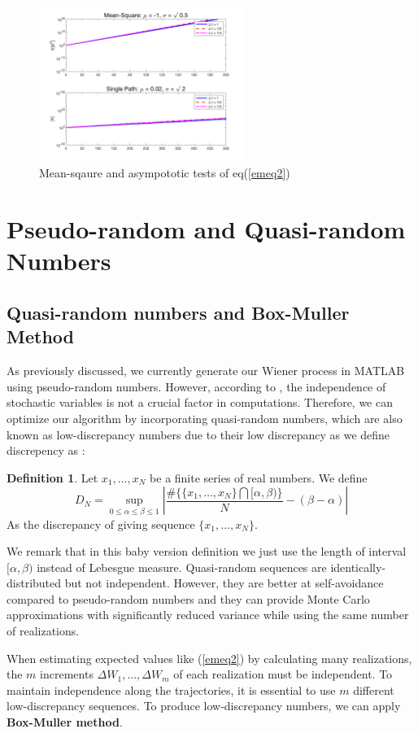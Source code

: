 \documentclass[12pt,a4paper]{article}
\theoremstyle{definition}
\newtheorem{defn}{Definition}
\begin{document}
\begin{figure}[htbp]
\centering
\includegraphics[width=0.6\textwidth]{fig/fig13.png}
\caption{\label{fig13} Mean-sqaure and asympototic tests of eq(\ref{emeq2})}
\end{figure}

\section{Pseudo-random and Quasi-random Numbers}
\subsection{Quasi-random numbers and Box-Muller Method}
As previously discussed, we currently generate our Wiener process in MATLAB using pseudo-random numbers. However, according to \cite{sauer}, the independence of stochastic variables is not a crucial factor in computations. Therefore, we can optimize our algorithm by incorporating quasi-random numbers, which are also known as low-discrepancy numbers due to their low discrepancy as we define discrepency as \cite{kuipers}:\begin{defn}
    Let $x_1,\dots, x_N$ be a finite series of real numbers. We define$$
    D_N=\sup_{0\le\alpha\le \beta\le 1}\left|\frac{\#\{\{x_1,\dots,x_N\}\bigcap [\alpha, \beta)\}}{N}-(\beta-\alpha)\right|
$$
    As the discrepancy of giving sequence $\{x_1,\dots,x_N\}$.
\end{defn}
We remark that in this baby version definition we just use the length of interval $[\alpha, \beta)$ instead of Lebesgue measure. Quasi-random sequences are identically-distributed but not independent. However, they are better at self-avoidance compared to pseudo-random numbers and they can provide Monte Carlo approximations with significantly reduced variance while using the same number of realizations.

When estimating expected values like (\ref{emeq2}) by calculating many realizations, the $m$ increments $\Delta W_1,\dots,\Delta W_m$ of each realization must be independent. To maintain independence along the trajectories, it is essential to use $m$ different low-discrepancy sequences. To produce low-discrepancy numbers, we can apply \textbf{Box-Muller method}. \cite{box-muller}
\end{document}
